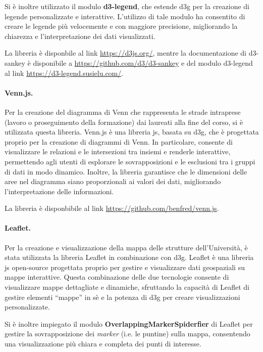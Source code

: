 Si è inoltre utilizzato il modulo \textbf{d3-legend}, che estende \gls{d3g} per la creazione di legende personalizzate e interattive. L'utilizzo di tale modulo ha 
consentito di creare le legende più velocemente e con maggiore precisione, migliorando la chiarezza e l'interpretazione dei dati visualizzati. 

La libreria è disponbile al link \href{https://d3js.org/}{https://d3js.org/}, mentre la documentazione di d3-sankey è disponibile a \href{https://github.com/d3/d3-sankey}{https://github.com/d3/d3-sankey} e del modulo d3-legend 
al link \href{https://d3-legend.susielu.com/}{https://d3-legend.susielu.com/}.

\paragraph{Venn.js.} 
Per la creazione del diagramma di Venn che rappresenta le strade intraprese (lavoro o proseguimento della formazione) dai laureati alla fine del corso, si è utilizzata questa libreria.
Venn.js è una libreria \gls{js}, basata su \gls{d3g}, che è progettata proprio per la creazione di diagrammi di Venn. 
In particolare, consente di visualizzare le relazioni e le intersezioni tra insiemi e renderle interattive, permettendo agli utenti di esplorare le sovrapposizioni e le esclusioni tra i gruppi di dati in modo dinamico. 
Inoltre, la libreria garantisce che le dimensioni delle aree nel diagramma siano proporzionali ai valori dei dati, migliorando l'interpretazione delle informazioni. 

La libreria è disponbibile al link \href{https://github.com/benfred/venn.js}{https://github.com/benfred/venn.js}.

\paragraph{Leaflet.} 
Per la creazione e visualizzazione della mappa delle strutture dell'Università, è stata utilizzata la libreria Leaflet in combinazione con \gls{d3g}. 
Leaflet è una libreria \gls{js} open-source progettata proprio per gestire e visualizzare dati geospaziali su mappe interattive.
Questa combinazione delle due tecnologie consente di visualizzare mappe dettagliate e dinamiche, sfruttando la capacità di Leaflet di gestire elementi ``mappe'' in sè
e la potenza di \gls{d3g} per creare visualizzazioni personalizzate.

Si è inoltre impiegato il modulo \textbf{OverlappingMarkerSpiderfier} di Leaflet per gestire la sovrapposizione dei \emph{marker} (i.e. le puntine) sulla mappa, consentendo 
una visualizzazione più chiara e completa dei punti di interesse.

